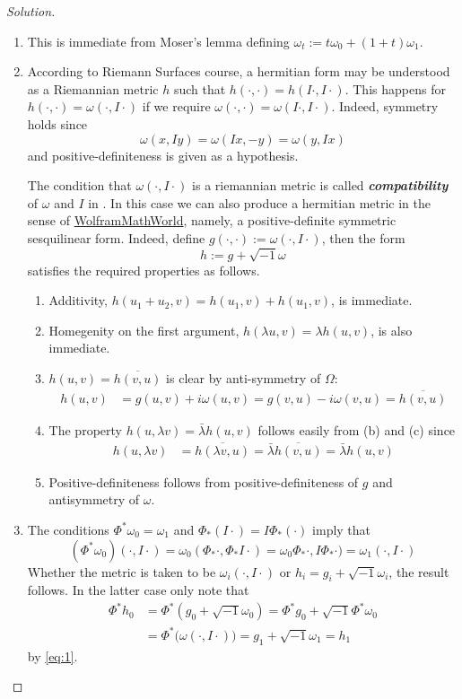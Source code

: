 \begin{proof}[Solution]\leavevmode
\begin{enumerate}[label=\alph*.]
\item This is immediate from Moser's lemma defining $\omega_t:=t\omega_0+(1+t)\omega_1$.
\item According to Riemann Surfaces course, a hermitian form may be understood as a Riemannian metric $h$ such that $h(\cdot,\cdot)=h(I\cdot,I\cdot)$. This happens for $h(\cdot,\cdot)=\omega(\cdot,I\cdot)$ if we require $\omega(\cdot,\cdot)=\omega(I\cdot,I\cdot)$. Indeed, symmetry holds since
	\[\omega(x,Iy)=\omega(Ix,-y)=\omega(y,Ix)\]
and positive-definiteness is given as a hypothesis.
	

	The condition that $\omega(\cdot,I\cdot)$ is a riemannian metric is called \textit{\textbf{compatibility}} of  $\omega$ and $I$ in  \cite{das}. In this case we can also produce a hermitian metric in the sense of  \href{https://mathworld.wolfram.com/HermitianInnerProduct.html}{WolframMathWorld}, namely, a positive-definite symmetric sesquilinear form. Indeed, define $g(\cdot,\cdot):=\omega(\cdot,I\cdot)$, then the form
	\[h:=g+\sqrt{-1}\omega\]
satisfies the required properties as follows.
	\begin{enumerate}
	\item Additivity, $h(u_1+u_2,v)=h(u_1,v)+h(u_1,v)$, is immediate.
	\item Homegenity on the first argument, $h(\lambda u,v)=\lambda h(u,v)$, is also immediate.

			\item $h(u,v)=\overline{h(v,u)}$ is clear by anti-symmetry of $\Omega$:
			\begin{align*}
				h(u,v)& =g(u,v)+i\omega(u,v) =g(v,u)-i\omega(v,u) =\overline{h(v,u)}
			\end{align*}
	\item The property $h(u,\lambda v)=\bar{\lambda} h(u,v)$ follows easily from (b) and (c) since 
			\begin{align*}
				h(u,\lambda v)& =\overline{h(\lambda v, u)}=\bar{\lambda} \overline{h(v,u)} =\bar{\lambda} h(u,v)
			\end{align*}
	\item Positive-definiteness follows from positive-definiteness of $g$ and antisymmetry of $\omega$.
	\end{enumerate}
	\item The conditions $\Phi^*\omega_0=\omega_1$ and $\Phi_*(I\cdot)=I\Phi_*(\cdot)$ imply that
		\begin{equation}\label{eq:1}(\Phi^*\omega_0)(\cdot,I\cdot)=\omega_0(\Phi_*\cdot,\Phi_*I\cdot)=\omega_0\Phi_*\cdot,I\Phi_*\cdot)=\omega_1(\cdot,I\cdot)\end{equation}
	Whether the metric is taken to be $\omega_i(\cdot,I\cdot)$ or $h_i=g_i+\sqrt{-1}\omega_i$, the result follows. In the latter case only note that
	\begin{align*}\Phi^*h_0&=\Phi^*(g_0+\sqrt{-1}\omega_0)=\Phi^*g_0+\sqrt{-1}\Phi^*\omega_0\\&=\Phi^*\Big(\omega(\cdot,I\cdot)\Big)=g_1+\sqrt{-1}\omega_1=h_1\end{align*}
	by \cref{eq:1}.
	

\end{enumerate}
\end{proof}
